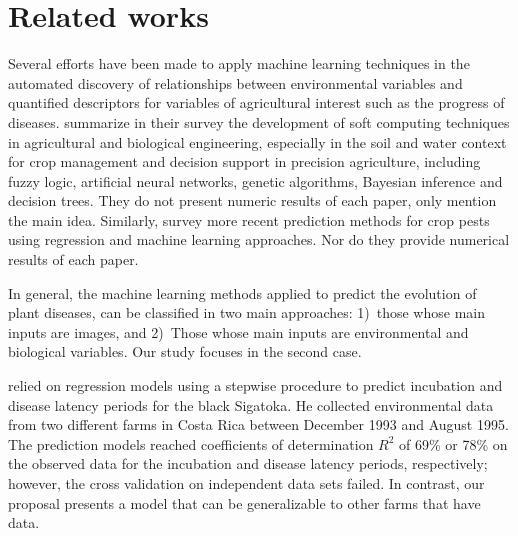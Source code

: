 \section{Related works}
\label{sec:related}

Several efforts have been made to apply machine learning techniques in
the automated discovery of relationships between environmental
variables and quantified descriptors for variables of agricultural 
interest such as the progress of diseases.
% 
\citet{Huang2010} summarize in their survey the
development of soft computing techniques in agricultural and
biological engineering, especially in the soil and water context for crop management and decision support in precision agriculture, including fuzzy logic, artificial neural
networks, genetic algorithms, Bayesian inference and decision trees. They do not present numeric results of each paper, only mention the main idea.
%
Similarly, \citet{Kim2014} survey more recent prediction
methods for crop pests using regression and machine learning approaches. Nor do they provide numerical results of each paper.


In general, the machine learning methods applied to predict the
evolution of plant diseases, can be classified in two main approaches:
1)~those whose main inputs are images, and 2)~Those whose main inputs
are environmental and biological variables. Our study focuses in the
second case.


% 
%
%

\citet{Romero1995} relied on regression models using a stepwise
procedure to predict incubation and disease latency periods for the
black Sigatoka.
% 
He collected environmental data from two different farms in Costa Rica
between December 1993 and August 1995.
%
The prediction models reached coefficients of determination $R^2$ of
69\% or 78\% on the observed data for the incubation and disease
latency periods, respectively; however, the cross validation on
independent data sets failed.
%
In contrast, our proposal presents a model that can be generalizable to other farms that have data.

